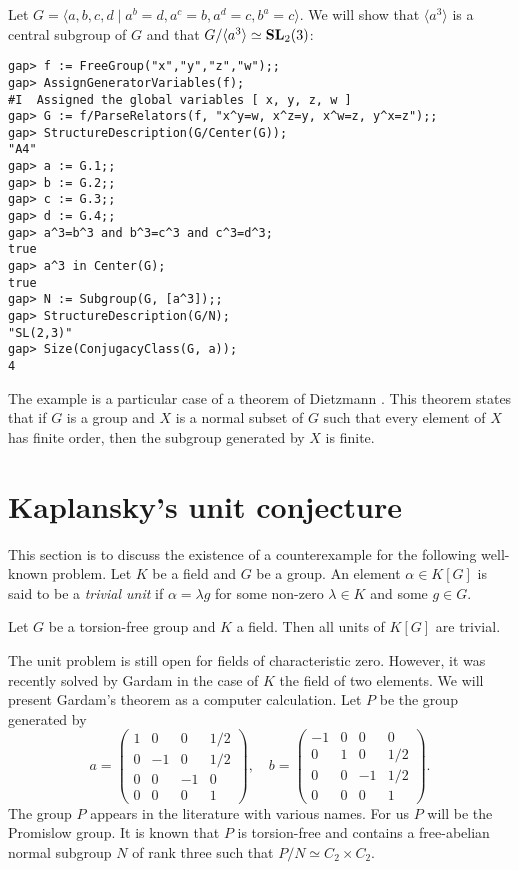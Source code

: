 \begin{example}
\label{exa:Dietzmann}
Let $G=\langle a,b,c,d \mid a^b=d,a^c=b,a^d=c,b^a=c\rangle$. 
We will show that $\langle a^3\rangle$ is a central subgroup of $G$ 
and that $G/\langle a^3\rangle\simeq\mathbf{SL}_2(3)$: 
\begin{lstlisting}
gap> f := FreeGroup("x","y","z","w");;
gap> AssignGeneratorVariables(f);
#I  Assigned the global variables [ x, y, z, w ]
gap> G := f/ParseRelators(f, "x^y=w, x^z=y, x^w=z, y^x=z");;
gap> StructureDescription(G/Center(G));
"A4"
gap> a := G.1;;
gap> b := G.2;;
gap> c := G.3;;
gap> d := G.4;;
gap> a^3=b^3 and b^3=c^3 and c^3=d^3;
true
gap> a^3 in Center(G);
true
gap> N := Subgroup(G, [a^3]);;
gap> StructureDescription(G/N);
"SL(2,3)"
gap> Size(ConjugacyClass(G, a));
4
\end{lstlisting}
The example is a particular case of a theorem of Dietzmann \cite[Theorem 5.10]{MR2426855}. This theorem states that
if $G$ is a group and $X$ is a normal subset of $G$ such that 
every element of $X$ has finite order, then the subgroup
generated by $X$ is finite. 
\end{example}

\section{Kaplansky's unit conjecture}

This section is to discuss the existence of a counterexample
for the following well-known problem. Let $K$ be a field
and $G$ be a group. An element
$\alpha\in K[G]$ is said to be a \emph{trivial unit}
if $\alpha=\lambda g$ for some non-zero $\lambda\in K$ and
some $g\in G$. 

\begin{conjecture}[Kaplansky]
\label{conj:Kaplansky}
Let $G$ be a torsion-free group and $K$ a field. Then 
all units of $K[G]$ are trivial.
\end{conjecture}

The unit problem is still open for fields of characteristic zero.
However, it was recently solved by Gardam \cite{MR4334981}
in the case of
$K$ the field of two elements. We will present Gardam's theorem
as a computer calculation.
Let $P$ be the group
generated by
\[
a=\begin{pmatrix}
1 & 0 & 0 & 1/2\\
0 & -1 & 0 & 1/2\\
0 & 0 & -1 & 0\\
0 & 0 & 0 & 1
\end{pmatrix},
\quad
b=\begin{pmatrix}
-1 & 0 & 0 & 0\\
0 & 1 & 0 & 1/2\\
0 & 0 & -1 & 1/2\\
0 & 0 & 0 & 1
\end{pmatrix}.
\]
The group $P$ appears in the literature with various names.
For us $P$ will be the Promislow group. It is known
that $P$ is torsion-free and contains 
a free-abelian normal subgroup $N$ of rank three
such that $P/N\simeq C_2\times C_2$. 

